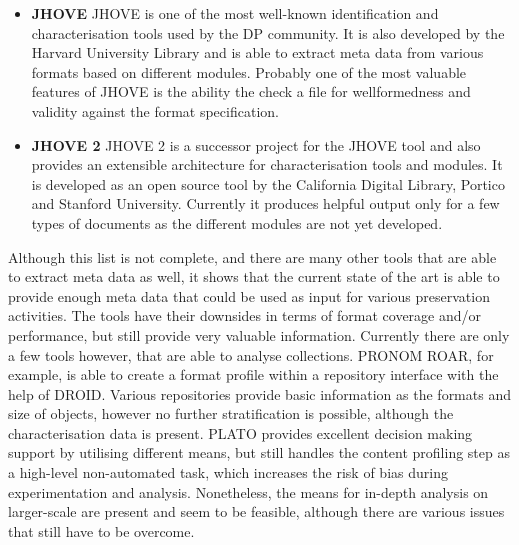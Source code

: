 \begin{itemize}
\item \textbf{JHOVE}\newline
JHOVE is one of the most well-known identification and characterisation tools used by the DP community. It is also developed by the Harvard University Library and is able to extract meta data from various formats based on different modules. Probably one of the most valuable features of JHOVE is the ability the check a file for wellformedness and validity against the format specification.

\item \textbf{JHOVE 2}\newline
JHOVE 2 is a successor project for the JHOVE tool and also provides an extensible architecture for characterisation tools and modules. It is developed as an open source tool by the California Digital Library, Portico and Stanford University. Currently it produces helpful output only for a few types of documents as the different modules are not yet developed.

\end{itemize}

Although this list is not complete, and there are many other tools that are able to extract meta data as well, it shows that the current state of the art is able to provide enough meta data that could be used as input for various preservation activities. The tools have their downsides in terms of format coverage and/or performance, but still provide very valuable information.
Currently there are only a few tools however, that are able to analyse collections. PRONOM ROAR, for example, is able to create a format profile within a repository interface with the help of DROID.
Various repositories provide basic information as the formats and size of objects, however no further stratification is possible, although the characterisation data is present.
PLATO provides excellent decision making support by utilising different means, but still handles the content profiling step as a high-level non-automated task, which increases the risk of bias during experimentation and analysis.
Nonetheless, the means for in-depth analysis on larger-scale are present and seem to be feasible, although there are various issues that still have to be overcome.


